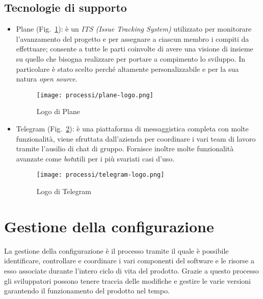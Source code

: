 \subsection{Tecnologie di supporto}
\begin{itemize}
    \item Plane (Fig.~\ref{fig:logo-plane}): è un \emph{ITS (Issue Tracking System)} utilizzato per monitorare l'avanzamento del progetto e per assegnare a ciascun membro i compiti da effettuare; consente a tutte le parti coinvolte di avere una visione di insieme su quello che bisogna realizzare per portare a compimento lo sviluppo. In particolare è stato scelto perché altamente personalizzabile e per la sua natura \emph{\gls{open source}}\glsfirstoccur.
    
    \begin{figure}[!h] 
        \centering 
        \texttt{[image: processi/plane-logo.png]} 
        \caption{Logo di Plane}
        \label{fig:logo-plane}
      \end{figure}

    \item Telegram (Fig.~\ref{fig:logo-telegram}): è una piattaforma di messaggistica completa con molte funzionalità, viene sfruttata dall'azienda per coordinare i vari team di lavoro tramite l'ausilio di chat di gruppo. Fornisce inoltre molte funzionalità avanzate come \emph{\gls{bot}}\glsfirstoccur utili per i più svariati casi d'uso.
    
    \begin{figure}[!h] 
        \centering 
        \texttt{[image: processi/telegram-logo.png]} 
        \caption{Logo di Telegram}
        \label{fig:logo-telegram}
      \end{figure}
\end{itemize}

\newpage

\section{Gestione della configurazione}
La gestione della configurazione è il processo tramite il quale è possibile identificare, controllare e coordinare i vari componenti del software e le risorse a esso associate durante l'intero ciclo di vita del prodotto. Grazie a questo processo gli sviluppatori possono tenere traccia delle modifiche e gestire le varie versioni garantendo il funzionamento del prodotto nel tempo.



